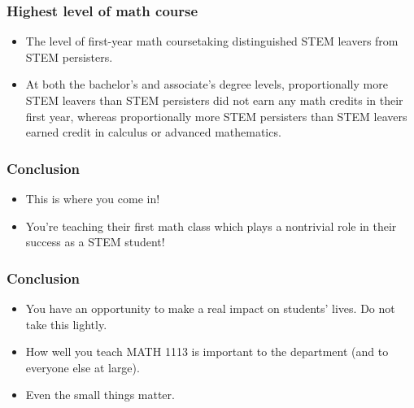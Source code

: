 \documentclass{beamer}
\begin{document}
\begin{frame}
  \frametitle{Highest level of math course}
  \begin{itemize}
    \item The level of first-year math coursetaking distinguished STEM leavers from STEM
persisters. 
\item At both the bachelor’s and associate’s degree levels, proportionally more
STEM leavers than STEM persisters did not earn any math credits in their first year,
whereas proportionally more STEM persisters than STEM leavers earned credit in
calculus or advanced mathematics.
\end{itemize}
\end{frame}

\begin{frame}
  \frametitle{Conclusion}
  \begin{itemize}
  \item This is where you come in!
  \item You're teaching their first math class which plays a nontrivial role in their success as a STEM student!
  \end{itemize}
\end{frame}

\begin{frame}
  \frametitle{Conclusion}
  \begin{itemize}
  \item You have an opportunity to make a real impact on students' lives.  Do not take this lightly.
  \item How well you teach MATH 1113 is important to the department (and to everyone else at large).
  \item Even the small things matter.  
  \end{itemize}
\end{frame}
\end{document}
